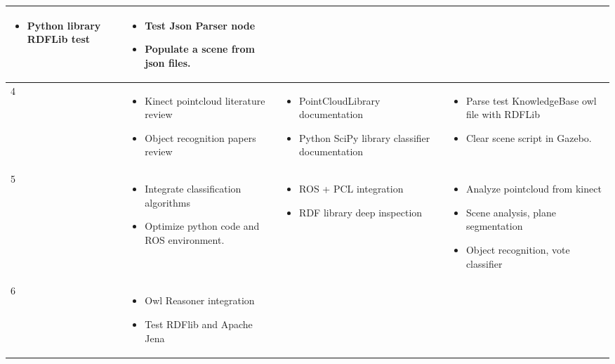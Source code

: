\begin{center}
\begin{tabular}{ | l | p{4cm} | p{4cm} | p{5cm} |}
\begin{itemize}
     \item Python library RDFLib test 
     \end{itemize} & 
     \begin{itemize}
     \item Test Json Parser node
     \item Populate a scene from json files. 
     \end{itemize} \\ \hline
    4 & \begin{itemize}
     \item Kinect pointcloud literature review
     \item Object recognition papers review
     \end{itemize}  & 
     \begin{itemize}
     \item PointCloudLibrary documentation \cite{bib16}
     \item Python SciPy library classifier documentation
     \end{itemize}
      & \begin{itemize}
     \item Parse test KnowledgeBase owl file with RDFLib
     \item Clear scene script in Gazebo.
     \end{itemize}  \\
    \hline
    5 & \begin{itemize}
     \item Integrate classification algorithms
     \item Optimize python code and ROS environment.
     \end{itemize} 
     & \begin{itemize}
     \item ROS + PCL integration
     \item RDF library deep inspection
     \end{itemize} 
      & \begin{itemize}
     \item Analyze pointcloud from kinect
     \item Scene analysis, plane segmentation
     \item Object recognition, vote classifier
     \end{itemize}  \\
    \hline
    6 & \begin{itemize}
     \item Owl Reasoner integration
     \item Test RDFlib and Apache Jena

\end{itemize}
\end{tabular}
\end{center}
